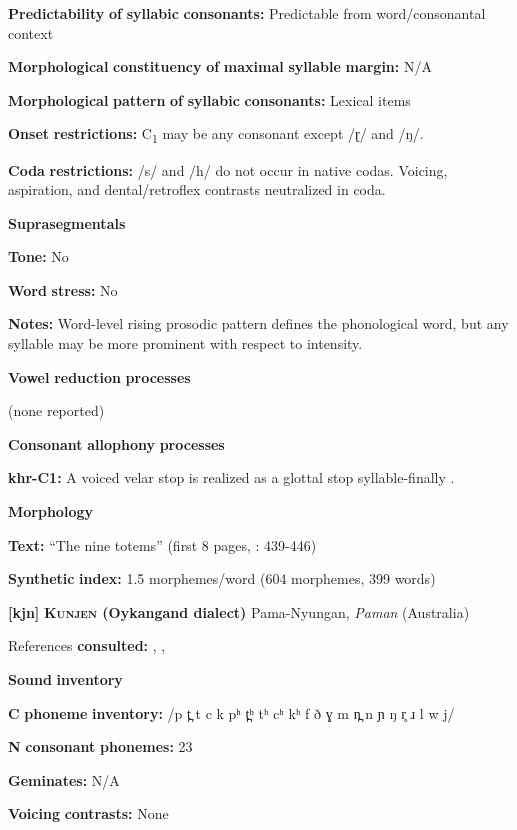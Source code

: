 \begin{styleBody}
\textbf{Predictability} \textbf{of} \textbf{syllabic} \textbf{consonants:} Predictable from word/consonantal context

\textbf{Morphological} \textbf{constituency} \textbf{of} \textbf{maximal} \textbf{syllable} \textbf{margin:} N/A

\textbf{Morphological} \textbf{pattern} \textbf{of} \textbf{syllabic} \textbf{consonants:} Lexical items

\textbf{Onset} \textbf{restrictions:} C\textsubscript{1} may be any consonant except /ɽ/ and /ŋ/.

\textbf{Coda} \textbf{restrictions:} /s/ and /h/ do not occur in native codas. Voicing, aspiration, and dental/retroflex contrasts neutralized in coda.

\textbf{Suprasegmentals}

\textbf{Tone:} No

\textbf{Word} \textbf{stress:} No

\textbf{Notes:} Word-level rising prosodic pattern defines the phonological word, but any syllable may be more prominent with respect to intensity.

\textbf{Vowel} \textbf{reduction} \textbf{processes}

(none reported)

\textbf{Consonant} \textbf{allophony} \textbf{processes}

\textbf{khr-C1:} A voiced velar stop is realized as a glottal stop syllable-finally \citep[29]{Peterson2011}.

\textbf{Morphology}

\textbf{Text:} “The nine totems” (first 8 pages, \citealt{Peterson2011}: 439-446)

\textbf{Synthetic} \textbf{index:} 1.5 morphemes/word (604 morphemes, 399 words)

\textbf{[kjn]}   \textbf{\textsc{Kunjen} \textbf{(Oykangand} \textbf{dialect)}}  Pama-Nyungan, \textit{Paman} (Australia)

References \textbf{consulted:} \citet{Dixon1970}, \citet{Sommer1969}, \citet{Sommer1981}

\textbf{Sound} \textbf{inventory}

\textbf{C} \textbf{phoneme} \textbf{inventory:} /p t̪ t c k pʰ t̪ʰ tʰ cʰ kʰ f ð ɣ m n̪ n ɲ ŋ r̥ ɹ l w j/

\textbf{N} \textbf{consonant} \textbf{phonemes:} 23

\textbf{Geminates:} N/A

\textbf{Voicing} \textbf{contrasts:} None


\end{styleBody}
